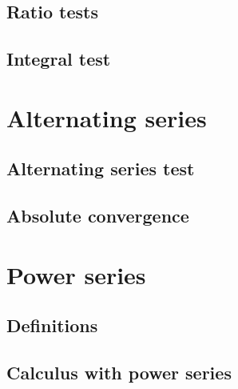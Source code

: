 \documentclass[justified]{tufte-book}
\begin{document}
\section{Ratio tests}
\label{section:ratio-test}


\section{Integral test}


\chapter{Alternating series}
\label{chapter:alternating-series}


\section{Alternating series test}
%

\section{Absolute convergence}
\label{section:absolute-convergence}
%

\chapter{Power series}
\label{chapter:power-series}

\startcontents[sections]%

\section{Definitions}
%
\section{Calculus with power series}
%

\end{document}
